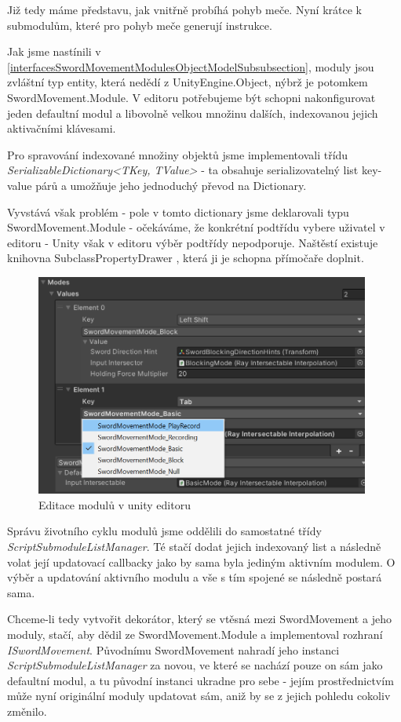 Již tedy máme představu, jak vnitřně probíhá pohyb meče. Nyní krátce k submodulům, které pro pohyb meče generují instrukce. 

Jak jsme nastínili v \ref{interfacesSwordMovementModulesObjectModelSubsubsection}, moduly jsou zvláštní typ entity, která nedědí z UnityEngine.Object, nýbrž je potomkem SwordMovement.Module. V editoru potřebujeme být schopni nakonfigurovat jeden defaultní modul a libovolně velkou množinu dalších, indexovanou jejich aktivačními klávesami.

Pro spravování indexované množiny objektů jsme implementovali třídu \textit{SerializableDictionary<TKey, TValue>} - ta obsahuje serializovatelný list key-value párů a umožňuje jeho jednoduchý převod na Dictionary. 

Vyvstává však problém - pole v tomto dictionary jsme deklarovali typu SwordMovement.Module - očekáváme, že konkrétní podtřídu vybere uživatel v editoru - Unity však v editoru výběr podtřídy nepodporuje. Naštěstí existuje knihovna SubclassPropertyDrawer \cite{SubclassPropertyDrawer}, která ji je schopna přímočaře doplnit.  

\begin{figure}[ht]\centering
  \center
  \includegraphics[width=110mm]{../img/swordMovementModulesEditor.png}
  \caption{Editace modulů v unity editoru}
  \label{obr05:swordModulePicker}
\end{figure} 

Správu životního cyklu modulů jsme oddělili do samostatné třídy \textit{ScriptSubmoduleListManager}. Té stačí dodat jejich indexovaný list a následně volat její updatovací callbacky jako by sama byla jediným aktivním modulem. O výběr a updatování aktivního modulu a vše s tím spojené se následně postará sama. 

Chceme-li tedy vytvořit dekorátor, který se vtěsná mezi SwordMovement a jeho moduly, stačí, aby dědil ze SwordMovement.Module a implementoval rozhraní \textit{ISwordMovement}. Původnímu SwordMovement nahradí jeho instanci \textit{ScriptSubmoduleListManager} za novou, ve které se nachází pouze on sám jako defaultní modul, a tu původní instanci ukradne pro sebe - jejím prostřednictvím může nyní originální moduly updatovat sám, aniž by se z jejich pohledu cokoliv změnilo.



